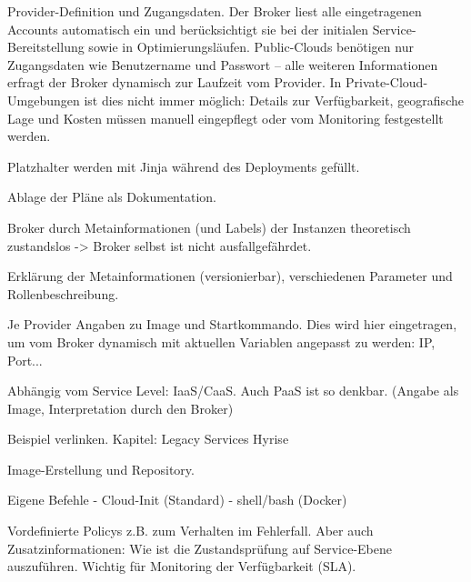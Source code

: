 %
%
\begin{listing}[ht]	
	\inputminted[]{yaml}{./src/provider.sample.yaml}
	\caption{Provider-Definition und Zugangsdaten. Der Broker liest alle eingetragenen Accounts automatisch ein und berücksichtigt sie bei der initialen Service-Bereitstellung sowie in Optimierungsläufen. Public-Clouds benötigen nur Zugangsdaten wie Benutzername und Passwort -- alle weiteren Informationen erfragt der Broker dynamisch zur Laufzeit vom Provider. In Private-Cloud-Umgebungen ist dies nicht immer möglich: Details zur Verfügbarkeit, geografische Lage und Kosten müssen manuell eingepflegt oder vom Monitoring festgestellt werden.}
	\label{listing:provider}
\end{listing}



Platzhalter werden mit Jinja während des Deployments gefüllt.

Ablage der Pläne als Dokumentation.

Broker durch Metainformationen (und Labels) der Instanzen theoretisch zustandslos -> Broker selbst ist nicht ausfallgefährdet.

Erklärung der Metainformationen (versionierbar), verschiedenen Parameter und Rollenbeschreibung.

Je Provider Angaben zu Image und Startkommando. Dies wird hier eingetragen, um vom Broker dynamisch mit aktuellen Variablen angepasst zu werden: IP, Port...

Abhängig vom Service Level: IaaS/CaaS. Auch PaaS ist so denkbar. (Angabe als Image, Interpretation durch den Broker)

Beispiel verlinken.
Kapitel: Legacy Services Hyrise

Image-Erstellung und Repository.

Eigene Befehle
- Cloud-Init (Standard)
- shell/bash (Docker)

Vordefinierte Policys z.B. zum Verhalten im Fehlerfall. Aber auch Zusatzinformationen: Wie ist die Zustandsprüfung auf Service-Ebene auszuführen. Wichtig für Monitoring der Verfügbarkeit (SLA).

